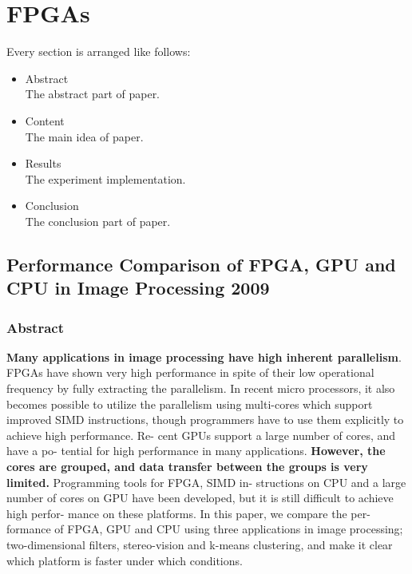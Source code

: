 \chapter{FPGAs}
{
\large
Every section is arranged like follows:
\begin{itemize}
\item Abstract\\
	The abstract part of paper.
\item Content\\
	The main idea of paper.
\item Results\\
	The experiment implementation.
\item Conclusion \\
	The conclusion part of paper.
\end{itemize}
}
\section{Performance Comparison of FPGA, GPU and CPU in Image Processing 2009}
\subsection{Abstract}
\indent \textbf{Many applications in image processing have high inherent
parallelism}. FPGAs have shown very high performance in
spite of their low operational frequency by fully extracting
the parallelism. In recent micro processors, it also becomes
possible to utilize the parallelism using multi-cores which
support improved SIMD instructions, though programmers
have to use them explicitly to achieve high performance. Re-
cent GPUs support a large number of cores, and have a po-
tential for high performance in many applications. \textbf{However,
the cores are grouped, and data transfer between the groups
is very limited.} Programming tools for FPGA, SIMD in-
structions on CPU and a large number of cores on GPU have
been developed, but it is still difficult to achieve high perfor-
mance on these platforms. In this paper, we compare the per-
formance of FPGA, GPU and CPU using three applications
in image processing; two-dimensional filters, stereo-vision
and k-means clustering, and make it clear which platform is
faster under which conditions.


